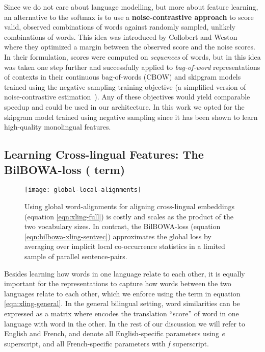 \documentclass[10pt]{article}
\newcommand\bld[1]{\textbf{#1}}
\begin{document}
Since we do not care about language modelling, but more about feature learning,
an alternative to the softmax is to use a \bld{noise-contrastive approach} to
score valid, observed combinations of words against randomly sampled, unlikely
combinations of words. This idea was introduced by Collobert and
Weston~\cite{collobert2011natural} where they optimized a margin between the
observed score and the noise scores. In their formulation, scores were computed
on \emph{sequences} of words, but in \cite{mikolov2013exploiting} this idea was taken one step further and
successfully applied to \emph{bag-of-word} representations of contexts in their
continuous bag-of-words (CBOW) and skipgram models trained using the negative 
sampling training objective (a simplified version of noise-contrastive estimation~\cite{mnih2012fast}). 
Any of these
objectives would yield comparable speedup and could be used in our architecture. In
this work we opted for the skipgram model trained using negative sampling since it
has been shown to learn high-quality monolingual features.



\subsection{Learning Cross-lingual Features: The BilBOWA-loss ( term)}
\label{sec:bilbowa-xling}

\begin{figure*}
  \begin{center}
    \texttt{[image: global-local-alignments]}
  \end{center}
  \caption{Using global word-alignments for aligning cross-lingual embeddings 
  (equation \ref{eqn:xling-full}) is costly 
  and scales as the product of the two vocabulary sizes. In contrast, the BilBOWA-loss 
  (equation \ref{eqn:bilbowa-xling-sentvec}) approximates the global loss by averaging over 
  implicit local co-occurrence statistics in a limited sample of parallel sentence-pairs.}
  \label{fig:bilbowa-approximation}
\end{figure*}

Besides learning how words in one language relate to each other, it is equally 
important for the representations to capture how words between the two languages
relate to each other, which we enforce using the  term in equation
\ref{eqn:xling-general}.  In the general bilingual setting, word
similarities can be expressed as a matrix  where  encodes the
translation ``score'' of word  in one language with word  in the other.
In the rest of our discussion we will refer to English and French, and denote all 
English-specific parameters using \emph{e} superscript, and all French-specific parameters
with \emph{f} superscript. 
\end{document}
